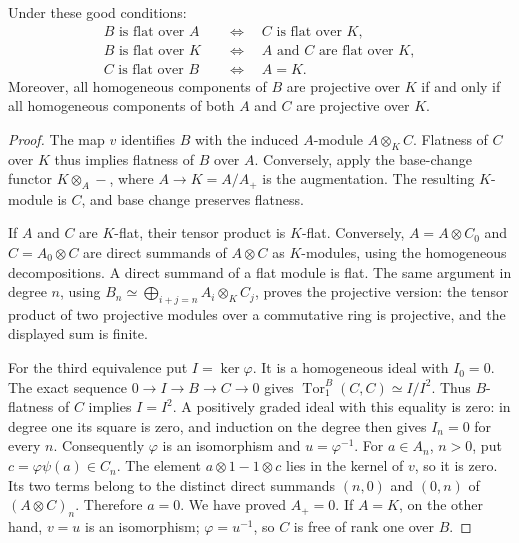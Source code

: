 \begin{theorem}\label{SA23-G-1}
Under these good conditions:
\begin{align*}
 B\text{ is flat over }A
 &\quad\Longleftrightarrow\quad C\text{ is flat over }K,\\
 B\text{ is flat over }K
 &\quad\Longleftrightarrow\quad
 A\text{ and }C\text{ are flat over }K,\\
 C\text{ is flat over }B
 &\quad\Longleftrightarrow\quad A=K.
\end{align*}
Moreover, all homogeneous components of $B$ are projective over $K$
if and only if all homogeneous components of both $A$ and $C$ are
projective over $K$.
\end{theorem}
\begin{proof}
The map $v$ identifies $B$ with the induced $A$-module $A\otimes_K C$.
Flatness of $C$ over $K$ thus implies flatness of $B$ over $A$.
Conversely, apply the base-change functor $K\otimes_A-$, where
$A\to K=A/A_+$ is the augmentation.  The resulting $K$-module is
$C$, and base change preserves flatness.

If $A$ and $C$ are $K$-flat, their tensor product is $K$-flat.
Conversely, $A=A\otimes C_0$ and $C=A_0\otimes C$ are direct
summands of $A\otimes C$ as $K$-modules, using the homogeneous
decompositions.  A direct summand of a flat module is flat.  The same
argument in degree $n$, using
$B_n\simeq\bigoplus_{i+j=n}A_i\otimes_K C_j$, proves the projective
version: the tensor product of two projective modules over a commutative
ring is projective, and the displayed sum is finite.

For the third equivalence put $I=\ker\varphi$.  It is a homogeneous
ideal with $I_0=0$.  The exact sequence $0\to I\to B\to C\to0$
gives $\operatorname{Tor}_1^B(C,C)\simeq I/I^2$.  Thus $B$-flatness
of $C$ implies $I=I^2$.  A positively graded ideal with this equality
is zero: in degree one its square is zero, and induction on the degree
then gives $I_n=0$ for every $n$.  Consequently $\varphi$ is an
isomorphism and $u=\varphi^{-1}$.  For $a\in A_n$, $n>0$, put
$c=\varphi\psi(a)\in C_n$.  The element
$a\otimes1-1\otimes c$ lies in the kernel of $v$, so it is zero.
Its two terms belong to the distinct direct summands $(n,0)$ and
$(0,n)$ of $(A\otimes C)_n$.  Therefore $a=0$.  We have proved
$A_+=0$.  If $A=K$, on the other hand, $v=u$ is an isomorphism;
$\varphi=u^{-1}$, so $C$ is free of rank one over $B$.
\end{proof}

